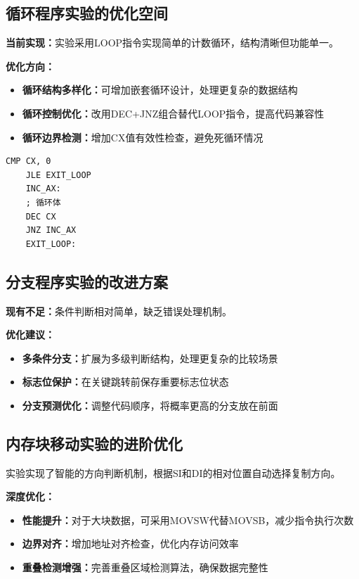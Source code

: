 \documentclass[UTF8]{article}
\begin{document}
\subsection{循环程序实验的优化空间}

\textbf{当前实现：}实验采用LOOP指令实现简单的计数循环，结构清晰但功能单一。

\textbf{优化方向：}
\begin{itemize}
	\item \textbf{循环结构多样化：}可增加嵌套循环设计，处理更复杂的数据结构
	\item \textbf{循环控制优化：}改用DEC+JNZ组合替代LOOP指令，提高代码兼容性
	\item \textbf{循环边界检测：}增加CX值有效性检查，避免死循环情况
\end{itemize}

\begin{lstlisting}[language={[x86masm]Assembler}]
	CMP CX, 0
	JLE EXIT_LOOP
	INC_AX:
	; 循环体
	DEC CX
	JNZ INC_AX
	EXIT_LOOP:
\end{lstlisting}

\subsection{分支程序实验的改进方案}
\textbf{现有不足：}条件判断相对简单，缺乏错误处理机制。

\textbf{优化建议：}
\begin{itemize}
	\item \textbf{多条件分支：}扩展为多级判断结构，处理更复杂的比较场景
	\item \textbf{标志位保护：}在关键跳转前保存重要标志位状态
	\item \textbf{分支预测优化：}调整代码顺序，将概率更高的分支放在前面
\end{itemize}

\subsection{内存块移动实验的进阶优化}

实验实现了智能的方向判断机制，根据SI和DI的相对位置自动选择复制方向。

\textbf{深度优化：}
\begin{itemize}
	\item \textbf{性能提升：}对于大块数据，可采用MOVSW代替MOVSB，减少指令执行次数
	\item \textbf{边界对齐：}增加地址对齐检查，优化内存访问效率
	\item \textbf{重叠检测增强：}完善重叠区域检测算法，确保数据完整性
\end{itemize}
\end{document}
